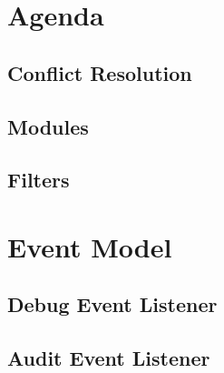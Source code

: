 \section{Agenda}
\subsection{Conflict Resolution}
\subsection{Modules}
\subsection{Filters}

\section{Event Model}
\subsection{Debug Event Listener}
\subsection{Audit Event Listener}
